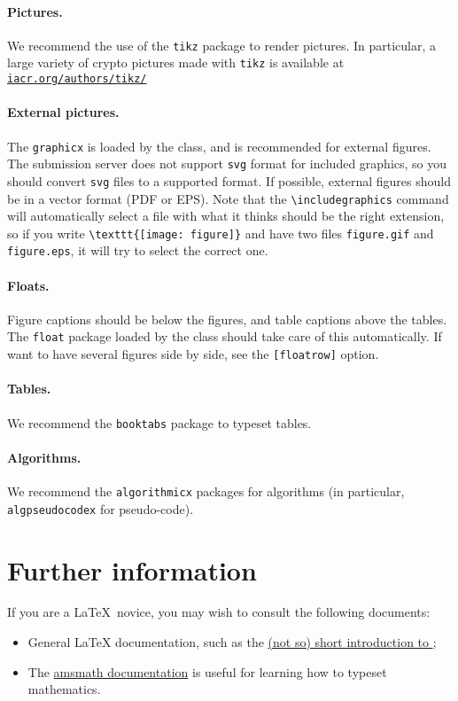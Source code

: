 \documentclass{iacrcc}
\begin{document}
\paragraph{Pictures.}
We recommend the use of the \texttt{tikz} package to render pictures.
In particular, a large variety of crypto pictures made with
\texttt{tikz} is available at \href{http://iacr.org/authors/tikz/}{\texttt{iacr.org/authors/tikz/}}

\paragraph{External pictures.}  The \texttt{graphicx} is loaded by the
class, and is recommended for external figures. The submission server
does not support \texttt{svg} format for included graphics, so you
should convert \texttt{svg} files to a supported format.  If possible,
external figures should be in a vector format (PDF or EPS).  Note that
the \verb+\includegraphics+ command will automatically select a file
with what it thinks should be the right extension, so if you write
\verb+\texttt{[image: figure]}+ and have two files \texttt{figure.gif}
and \texttt{figure.eps}, it will try to select the correct one.

\paragraph{Floats.}
Figure captions should be below the figures, and table captions above
the tables.  The \texttt{float} package loaded by the class should
take care of this automatically.  If want to have several figures side
by side, see the \texttt{[floatrow]} option.

\paragraph{Tables.}
We recommend the \texttt{booktabs} package to typeset tables.

\paragraph{Algorithms.}
We recommend the \texttt{algorithmicx} packages for algorithms (in
particular, \texttt{algpseudocodex} for pseudo-code).

\section{Further information}
If you are a \LaTeX\ novice, you may wish to consult the following documents:
\begin{itemize}
\item General \LaTeX{} documentation, such as the
  \href{http://mirrors.ctan.org/info/lshort/english/lshort.pdf}{(not
    so) short introduction to \LaTeXe};
\item The
  \href{https://mirror.mwt.me/ctan/macros/latex/required/amsmath/amsldoc.pdf}{amsmath
    documentation} is useful for learning how to typeset mathematics.
\end{itemize}


\end{document}

